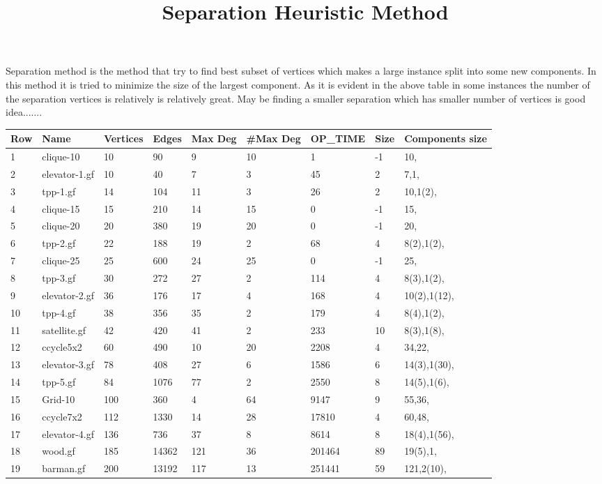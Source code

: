 \documentclass{article}
\title{Separation Heuristic Method}
\begin{document}
\maketitle
Separation method is the method that try to find best subset of vertices which makes a large instance split into some new components. In this method it is tried to minimize the size of the largest component. As it is evident in the above table in some instances the number of the separation vertices is relatively is relatively great. May be finding a smaller separation which has smaller number of vertices is good idea.......
\begin{longtable}{|l |l |l |l |l |l |l |l |l |}
\hline
Row&Name&Vertices&Edges&Max Deg&\#Max Deg&OP_TIME&Size&Components size\\
\hline
1&clique-10&10&90&9&10&1&-1&10,\\
2&elevator-1.gf&10&40&7&3&45&2&7,1,\\
3&tpp-1.gf&14&104&11&3&26&2&10,1(2),\\
4&clique-15&15&210&14&15&0&-1&15,\\
5&clique-20&20&380&19&20&0&-1&20,\\
6&tpp-2.gf&22&188&19&2&68&4&8(2),1(2),\\
7&clique-25&25&600&24&25&0&-1&25,\\
8&tpp-3.gf&30&272&27&2&114&4&8(3),1(2),\\
9&elevator-2.gf&36&176&17&4&168&4&10(2),1(12),\\
10&tpp-4.gf&38&356&35&2&179&4&8(4),1(2),\\
11&satellite.gf&42&420&41&2&233&10&8(3),1(8),\\
12&ccycle5x2&60&490&10&20&2208&4&34,22,\\
13&elevator-3.gf&78&408&27&6&1586&6&14(3),1(30),\\
14&tpp-5.gf&84&1076&77&2&2550&8&14(5),1(6),\\
15&Grid-10&100&360&4&64&9147&9&55,36,\\
16&ccycle7x2&112&1330&14&28&17810&4&60,48,\\
17&elevator-4.gf&136&736&37&8&8614&8&18(4),1(56),\\
18&wood.gf&185&14362&121&36&201464&89&19(5),1,\\
19&barman.gf&200&13192&117&13&251441&59&121,2(10),\\
\hline
\end{longtable}
\end{document}
